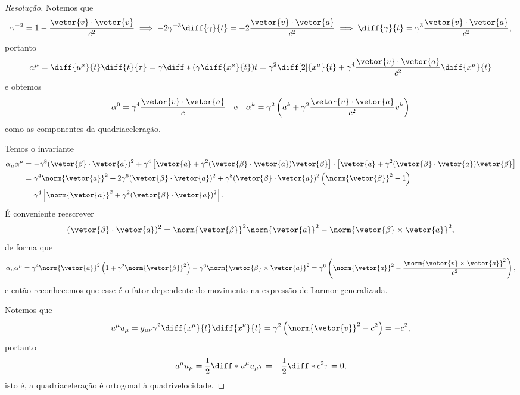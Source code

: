 \begin{proof}[Resolução]
    Notemos que
    \begin{equation*}
       \gamma^{-2} = 1 - \frac{\vetor{v}\cdot \vetor{v}}{c^2} \implies -2 \gamma^{-3} \diff{\gamma}{t} = - 2 \frac{\vetor{v} \cdot \vetor{a}}{c^2} \implies \diff{\gamma}{t} = \gamma^3 \frac{\vetor{v} \cdot \vetor{a}}{c^2},
    \end{equation*}
    portanto
    \begin{equation*}
       \alpha^\mu = \diff{u^\mu}{t}\diff{t}{\tau} = \gamma \diff*{\left(\gamma \diff{x^\mu}{t}\right)}{t} = \gamma^2 \diff[2]{x^\mu}{t} + \gamma^4 \frac{\vetor{v}\cdot \vetor{a}}{c^2} \diff{x^\mu}{t} 
    \end{equation*}
    e obtemos
    \begin{equation*}
        \alpha^0  = \gamma^4\frac{\vetor{v}\cdot\vetor{a}}{c} \quad\text{e}\quad \alpha^k = \gamma^2 \left(a^k + \gamma^2 \frac{\vetor{v}\cdot \vetor{a}}{c^2}v^k\right)
    \end{equation*}
    como as componentes da quadriaceleração.

    Temos o invariante
    \begin{align*}
       \alpha_\mu \alpha^\mu &= -\gamma^8 (\vetor{\beta} \cdot \vetor{a})^2 + \gamma^4 \left[\vetor{a} + \gamma^2(\vetor{\beta} \cdot \vetor{a})\vetor{\beta}\right] \cdot \left[\vetor{a} + \gamma^2(\vetor{\beta} \cdot \vetor{a})\vetor{\beta}\right]\\
                             &= \gamma^4 \norm{\vetor{a}}^2 + 2 \gamma^6 (\vetor{\beta}\cdot\vetor{a})^2 + \gamma^8 (\vetor{\beta}\cdot \vetor{a})^2 \left(\norm{\vetor{\beta}}^2 - 1\right)\\
                             &= \gamma^4 \left[\norm{\vetor{a}}^2 + \gamma^2 (\vetor{\beta}\cdot \vetor{a})^2\right].
    \end{align*}
    É conveniente reescrever
    \begin{equation*}
       (\vetor{\beta}\cdot \vetor{a})^2 = \norm{\vetor{\beta}}^2 \norm{\vetor{a}}^2 - \norm{\vetor{\beta}\times \vetor{a}}^2,
    \end{equation*}
    de forma que
    \begin{equation*}
       \alpha_\mu \alpha^\mu = \gamma^4 \norm{\vetor{a}}^2 \left(1 + \gamma^2 \norm{\vetor{\beta}}^2\right) - \gamma^6\norm{\vetor{\beta}\times \vetor{a}}^2 = \gamma^6 \left(\norm{\vetor{a}}^2 - \frac{\norm{\vetor{v}\times \vetor{a}}^2}{c^2}\right),
    \end{equation*}
    e então reconhecemos que esse é o fator dependente do movimento na expressão de Larmor generalizada.

    Notemos que
    \begin{equation*}
       u^\mu u_\mu = g_{\mu\nu} \gamma^2\diff{x^\mu}{t} \diff{x^\nu}{t} = \gamma^2 \left(\norm{\vetor{v}}^2 - c^2\right) = - c^2,
    \end{equation*}
    portanto
    \begin{equation*}
       a^\mu u_\mu = \frac12\diff*{u^\mu u_\mu}{\tau} = -\frac12 \diff*{c^2}{\tau} = 0,
    \end{equation*}
    isto é, a quadriaceleração é ortogonal à quadrivelocidade.
\end{proof}
